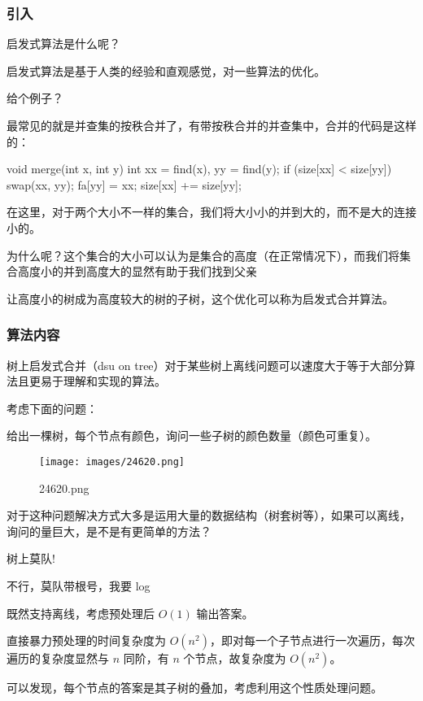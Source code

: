
\subsubsection{引入}

启发式算法是什么呢？

启发式算法是基于人类的经验和直观感觉，对一些算法的优化。

给个例子？

最常见的就是并查集的按秩合并了，有带按秩合并的并查集中，合并的代码是这样的：

\begin{cppcode}
void merge(int x, int y) {
  int xx = find(x), yy = find(y);
  if (size[xx] < size[yy]) swap(xx, yy);
  fa[yy] = xx;
  size[xx] += size[yy];
}
\end{cppcode}

在这里，对于两个大小不一样的集合，我们将大小小的并到大的，而不是大的连接小的。

为什么呢？这个集合的大小可以认为是集合的高度（在正常情况下），而我们将集合高度小的并到高度大的显然有助于我们找到父亲

让高度小的树成为高度较大的树的子树，这个优化可以称为启发式合并算法。

\subsubsection{算法内容}

树上启发式合并（dsu on tree）对于某些树上离线问题可以速度大于等于大部分算法且更易于理解和实现的算法。

考虑下面的问题：

给出一棵树，每个节点有颜色，询问一些子树的颜色数量（颜色可重复）。

\begin{figure}[h]
\centering
\texttt{[image: images/24620.png]} 
\caption{24620.png}
\end{figure}   

对于这种问题解决方式大多是运用大量的数据结构（树套树等），如果可以离线，询问的量巨大，是不是有更简单的方法？

树上莫队!

不行，莫队带根号，我要 log

既然支持离线，考虑预处理后 $O(1)$ 输出答案。

直接暴力预处理的时间复杂度为 $O(n^2)$，即对每一个子节点进行一次遍历，每次遍历的复杂度显然与 $n$ 同阶，有 $n$ 个节点，故复杂度为 $O(n^2)$。

可以发现，每个节点的答案是其子树的叠加，考虑利用这个性质处理问题。

